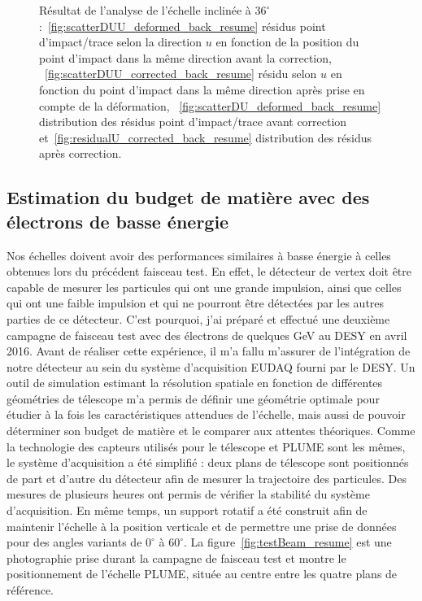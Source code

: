 \begin{figure}[!h]
    \caption{Résultat de l'analyse de l'échelle inclinée à $36^{\circ}$ :~\ref{fig:scatterDUU_deformed_back_resume} résidus point d'impact/trace selon la direction $u$ en fonction de la position du point d'impact dans la même direction avant la correction, ~\ref{fig:scatterDUU_corrected_back_resume} résidu selon $u$ en fonction du point d'impact dans la même direction après prise en compte de la déformation, ~\ref{fig:scatterDU_deformed_back_resume} distribution des résidus point d'impact/trace avant correction et~\ref{fig:residualU_corrected_back_resume} distribution des résidus après correction.}
    \label{fig:defCor_resume} 
   \end{figure}

    \subsection{Estimation du budget de matière avec des électrons de basse énergie}

  Nos échelles doivent avoir des performances similaires à basse énergie à celles obtenues lors du précédent faisceau test.
  En effet, le détecteur de vertex doit être capable de mesurer les particules qui ont une grande impulsion, ainsi que celles qui ont une faible impulsion et qui ne pourront être détectées par les autres parties de ce détecteur.
  C'est pourquoi, j'ai préparé et effectué une deuxième campagne de faisceau test avec des électrons de quelques GeV au DESY en avril 2016.
  Avant de réaliser cette expérience, il m'a fallu m'assurer de l'intégration de notre détecteur au sein du système d'acquisition EUDAQ fourni par le DESY. 
  Un outil de simulation estimant la résolution spatiale en fonction de différentes géométries de télescope m'a permis de définir une géométrie optimale pour étudier à la fois les caractéristiques attendues de l'échelle, mais aussi de pouvoir déterminer son budget de matière et le comparer aux attentes théoriques.
  Comme la technologie des capteurs utilisés pour le télescope et PLUME sont les mêmes, le système d'acquisition a été simplifié : deux plans de télescope sont positionnés de part et d'autre du détecteur afin de mesurer la trajectoire des particules. 
  Des mesures de plusieurs heures ont permis de vérifier la stabilité du système d'acquisition. 
  En même temps, un support rotatif a été construit afin de maintenir l'échelle à la position verticale et de permettre une prise de données pour des angles variants de $0^{\circ}$ à $60^{\circ}$.
  La figure~\ref{fig:testBeam_resume} est une photographie prise durant la campagne de faisceau test et montre le positionnement de l'échelle PLUME, située au centre entre les quatre plans de référence.
 
